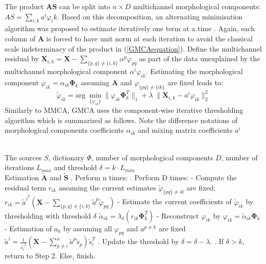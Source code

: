 The product $\mathbf{AS}$ can be split into $n\times D$ multichannel morphological components: $AS = \sum_{i,k}a^i\varphi_ik$. Based on this decomposition, an alternating minimisation algorithm was proposed to estimate iteratively one term at a time \cite{BobinJ_2007SaMD}. Again, each column of $\mathbf{A}$ is forced to have unit norm at each iteration to avoid the classical scale indeterminacy of the product in (\ref{GMCAequation}). Define the multichannel residual by $\mathbf{X}_{i,k} = \mathbf{X} - \sum_{\{p,q\}\neq \{i,k\}} \alpha^p \varphi_{pq}$ as part of the data unexplained by the multichannel morphological component $\alpha^i \varphi_{ik}$. Estimating the morphological component $\varphi_{ik} = \alpha_{ik}\mathbf{\Phi}_k$ assuming $\mathbf{A}$ and $\varphi_{\{pq\} \neq \{ik\}}$ are fixed leads to: 
\begin{equation}
    \tilde{\varphi}_{ik} = \text{arg} \; \min_{\{\varphi_{ik}\}} \lVert \varphi_{ik}\mathbf{\Phi}_k^T\rVert_{1} + \lambda \; \lVert \mathbf{X}_{i,k} - a^i\varphi_{ik}\rVert_2^2
\end{equation}
Similarly to MMCA, GMCA uses the component-wise iterative thresholding algorithm which is summarized as follows. Note the difference notations of morphological components coefficients $\alpha_{ik}$ and mixing matrix coefficients $a^i$
\newpage
\begin{algorithm}[H] 
\label{algFramwork3} 
\begin{algorithmic}
\REQUIRE ~~\\%
The sources $S$, dictionary $\Phi$, number of morphological components $D$, number of iterations $L_{max}$ and threshold $\delta = k \cdot L_{max}$
\ENSURE ~~\\ %
Estimation $\tilde{\mathbf{A}}$ and $\tilde{\mathbf{S}}$
. Perform n times:
\STATE {}. Perform D times:
\STATE \qquad \quad - Compute the residual term $r_{ik}$ assuming the current estimates $\tilde{\varphi}_{\{pq\} \neq ik}$ are fixed; 
\STATE \qquad \quad $r_{ik} = \tilde{a}^i^T(\mathbf{X} - \sum_{\{p,q\} \neq \{i,k\}} \tilde{a}^p \tilde{\varphi}_{pq}) $
\STATE \qquad \quad - Estimate the current coefficients of $\tilde{\varphi}_{ik}$ by thresholding with threshold $\delta$
\STATE \qquad \quad $\tilde{\alpha}_{ik} = \lambda_{\delta}(r_{ik}\mathbf{\Phi}_k^T)$
\STATE \qquad \quad - Reconstruct $\varphi_{ik}$ by $\varphi_{ik} = \tilde{\alpha}_{ik} \mathbf{\Phi}_k$
\STATE \qquad \quad - Estimation of $a_k$ by assuming all $\varphi_{pq}$ and $a^{p \neq k}$ are fixed 
\STATE \qquad \quad $\tilde{a}^i = \frac{1}{\tilde{s_i}^2}(\mathbf{X} - \sum_{p\neq i}^n \tilde{a}^p\tilde{s}_p)\tilde{s}_i^T$
. Update the threshold by $\delta = \delta - \lambda$.
. If $\delta>k $, return to Step 2. Else, finish.
\end{algorithmic}
\end{algorithm}


